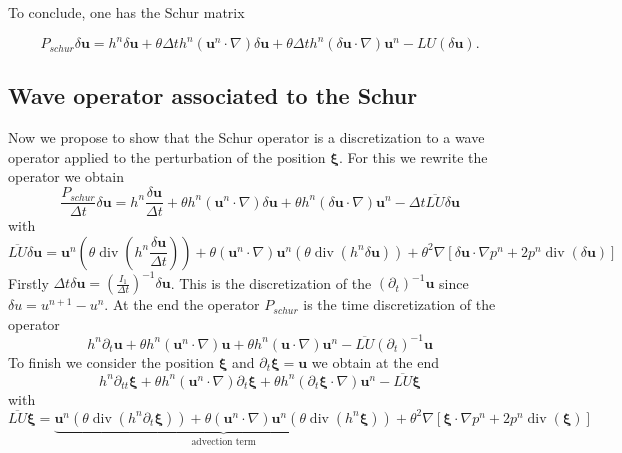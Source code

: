 \documentclass[a4paper, 11pt]{report}
\begin{document}
To conclude, one has the Schur matrix 
\begin{small}
\begin{equation*}
P_{schur}\delta \boldsymbol{u}=h^n \delta \boldsymbol{u}+\theta\Delta th^n\left(\boldsymbol{u}^n\cdot\nabla\right)\delta \boldsymbol{u}+\theta\Delta th^n\left(\delta \boldsymbol{u} \cdot\nabla\right)\boldsymbol{u}^n-LU(\delta \boldsymbol{u}).
\end{equation*}
\end{small}


\subsection{Wave operator associated to the Schur}
Now we propose to show that the Schur operator is a discretization to a wave operator applied to the perturbation of the position $\boldsymbol{\xi} $.
For this we rewrite the operator we obtain
$$
\frac{P_{schur}}{\Delta t}\delta \boldsymbol{u}= h^n\frac{\delta \boldsymbol{u}}{\Delta t}+\theta h^n\left(\boldsymbol{u}^n\cdot\nabla\right)\delta \boldsymbol{u}+\theta h^n\left(\delta \boldsymbol{u} \cdot\nabla\right)\boldsymbol{u}^n-\Delta t \overline{LU}\delta \boldsymbol{u}
$$
with
$$
\overline{LU}\delta \boldsymbol{u}=\boldsymbol{u}^n\left(\theta \operatorname{div}(h^n\frac{ \delta \boldsymbol{u}}{\Delta t})\right)+\theta \left(\boldsymbol{u}^n\cdot \nabla \right)\boldsymbol{u}^n \left(\theta \operatorname{div}(h^n \delta \boldsymbol{u})\right)
+\theta^2 \nabla\left[ \delta \boldsymbol{u}\cdot \nabla p^n + 2p^n \operatorname{div}(\delta \boldsymbol{u}) \right]
$$
Firstly $\Delta t \delta  \boldsymbol{u}=(\frac{I_1}{\Delta t})^{-1} \delta \boldsymbol{u}$.  This is the discretization of the $(\partial_t )^{-1} \boldsymbol{u}$ since $\delta u=u^{n+1}-u^n$. At the end the operator $P_{schur}$ is the time discretization of the operator
$$
h^n\partial_t \boldsymbol{u}+\theta h^n\left(\boldsymbol{u}^n\cdot\nabla\right) \boldsymbol{u}+\theta h^n\left( \boldsymbol{u} \cdot\nabla\right)\boldsymbol{u}^n- \overline{LU} (\partial_t )^{-1}  \boldsymbol{u}
$$
To finish we consider the position $\boldsymbol{\xi} $ and $\partial_t \boldsymbol{\xi} =  \boldsymbol{u}$ we obtain at the end
$$
h^n\partial_{tt} \boldsymbol{\xi}+\theta h^n\left(\boldsymbol{u}^n\cdot\nabla\right) \partial_t\boldsymbol{\xi}+\theta h^n\left( \partial_t \boldsymbol{\xi} \cdot\nabla\right)\boldsymbol{u}^n- \overline{LU}  \boldsymbol{\xi}
$$
with
$$
\overline{LU} \boldsymbol{\xi}=\underbrace{\boldsymbol{u}^n\left(\theta \operatorname{div}(h^n \partial_t\boldsymbol{\xi})\right)+\theta \left(\boldsymbol{u}^n\cdot \nabla\right) \boldsymbol{u}^n \left(\theta \operatorname{div}(h^n \boldsymbol{\xi})\right)}_{\text{advection term}}
+\theta^2 \nabla\left[ \boldsymbol{\xi}\cdot \nabla p^n + 2p^n \operatorname{div}( \boldsymbol{\xi}) \right]
$$
\end{document}

